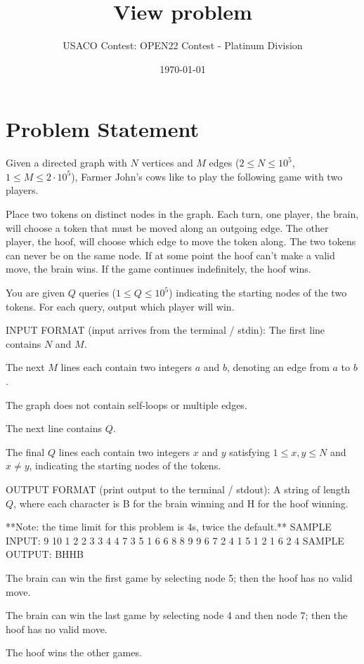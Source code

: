 \documentclass[12pt]{article}
\title{View problem}
\author{USACO Contest: OPEN22 Contest - Platinum Division}
\date{\today}
\begin{document}
\maketitle

\section*{Problem Statement}

Given a directed graph with $N$ vertices and $M$ edges ($2 \leq N \leq 10^5$,
$1 \leq M \leq 2 \cdot 10^5$), Farmer John's cows like to play the following
game with two players.

Place two tokens on distinct nodes in
the graph. Each turn, one player, the brain, will choose a token that must be
moved along an outgoing edge. The other player, the hoof, will choose which edge
to move the token along. The two tokens can never be on the same node. If at
some point the hoof can't make a valid move, the brain wins. If the game
continues indefinitely, the hoof wins.

You are given $Q$ queries ($1 \leq Q \leq 10^5$) indicating the starting nodes
of the two tokens. For each query, output which player will win.

INPUT FORMAT (input arrives from the terminal / stdin):
The first line contains $N$ and $M$.

The next $M$ lines each contain two integers $a$ and $b$, denoting an edge from
$a$ to $b$.

The graph does not contain self-loops or multiple edges.

The next line contains $Q$.

The final $Q$ lines each contain two integers $x$ and $y$ satisfying
$1\le x,y\le N$ and $x\neq y$, indicating the starting nodes of the tokens.

OUTPUT FORMAT (print output to the terminal / stdout):
A string of length $Q$, where each character is B for the brain winning and H
for the hoof winning.

**Note: the time limit for this problem is 4s, twice the default.**
SAMPLE INPUT:
9 10
1 2
2 3
3 4
4 7
3 5
1 6
6 8
8 9
9 6
7 2
4
1 5
1 2
1 6
2 4
SAMPLE OUTPUT: 
BHHB

The brain can win the first game by selecting node 5; then the hoof has no valid
move.

The brain can win the last game by selecting node 4 and then node 7; then the
hoof has no valid move.

The hoof wins the other games.
\end{document}
